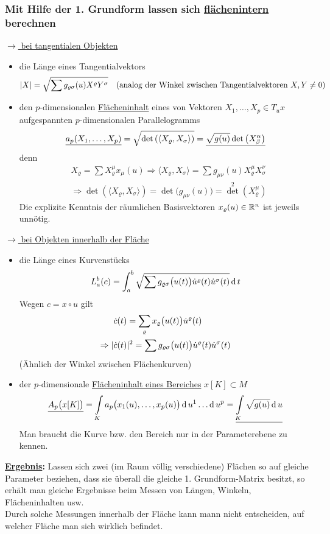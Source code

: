 \subsubsection{Mit Hilfe der 1. Grundform lassen sich \uline{flächenintern} berechnen}
\uline{\(\rightarrow\) bei tangentialen Objekten}
\begin{itemize}
 \item die Länge eines Tangentialvektors 
 \[
  |X| = \sqrt{\sum g_{\varrho \sigma}(u) X^\varrho Y^\sigma} \quad (\text{analog der Winkel zwischen Tangentialvektoren }X,Y \ne 0)
 \]
 \item den \(p\)-dimensionalen \uline{Flächeninhalt} eines von Vektoren \(X_1, \dots, X_p \in T_u x\) aufgespannten \(p\)-dimensionalen Parallelogramms
 \[
  \uline{a_p ( X_1, \dots, X_p)} = \sqrt{\det \left( \left\langle X_\varrho, X_ \sigma \right\rangle \right)} = \uline{\sqrt{g(u)} \det \left(X_\beta^\alpha\right)}
 \]
 denn
 \begin{align*}
  &X_\varrho = \sum X_\varrho^\mu x_\mu(u) \Rightarrow \langle X_\varrho, X_\sigma \rangle = \sum g_{\mu \nu} (u) X_\varrho^\mu X_\sigma^\nu  \\
  &\Rightarrow \det \left(\langle X_\varrho, X_\sigma \rangle \right) = \det \big(g_{\mu \nu}(u)\big) = {\det}^2 \left(X_\varrho^\mu \right)
 \end{align*}
 Die explizite Kenntnis der räumlichen Basisvektoren \(x_\varrho (u) \in \mathbb{R}^n\) ist jeweils unnötig.
\end{itemize}
\uline{\(\rightarrow\) bei Objekten innerhalb der Fläche}
\begin{itemize}
 \item die Länge eines Kurvenstücks
 \[
  L_a^b (c) = \int_a^b \sqrt{\sum g_{\varrho \sigma}\big(u(t)\big) \dot u^\varrho(t) \dot u^\sigma(t)} \operatorname{d} t
 \]
 Wegen \(c = x \circ u\) gilt
 \begin{align*}
  &\dot c(t) = \sum_\varrho x_\varrho \big(u(t)\big) \dot u^\varrho (t) \\
  \Rightarrow | &\dot c (t) |^2 = \sum g_{\varrho \sigma} \big(u(t)\big) \dot u^\varrho (t) \dot u^\sigma (t)
 \end{align*}
(Ähnlich der Winkel zwischen Flächenkurven)
 \item der \(p\)-dimensionale \uline{Flächeninhalt eines Bereiches} \(x[K] \subset M\)
 \[
  \uline{A_p\big(x[K]\big)} = \int\limits_K a_p \big(x_1(u), \dots, x_p(u) \big) \dd u^1 \dots \dd u^p = \uline{\int\limits_K \sqrt{g(u)} \dd u}
 \]
 Man braucht die Kurve bzw. den Bereich nur in der Parameterebene zu kennen.
\end{itemize}
\textbf{\uline{Ergebnis}:} Lassen sich zwei (im Raum völlig verschiedene) Flächen so auf gleiche Parameter beziehen, dass sie überall die gleiche 1. Grundform-Matrix besitzt, so erhält man gleiche Ergebnisse beim Messen von Längen, Winkeln, Flächeninhalten usw. \\
Durch solche Messungen innerhalb der Fläche kann mann nicht entscheiden, auf welcher Fläche man sich wirklich befindet.

